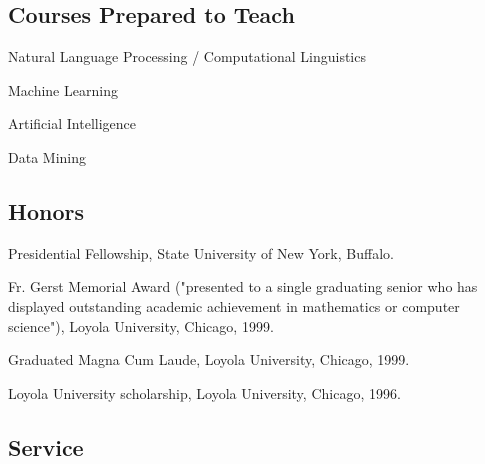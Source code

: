 \documentclass[letterpaper]{article}
\renewenvironment{itemize}{
  \begin{list}{}{
    \setlength{\leftmargin}{1.5em}
  }
}{
  \end{list}
}
\begin{document}
\subsection*{Courses Prepared to Teach}

\begin{itemize}
\item Natural Language Processing / Computational Linguistics
\item Machine Learning
\item Artificial Intelligence
\item Data Mining
\end{itemize}

\subsection*{Honors}
\begin{itemize}
\item Presidential Fellowship, State University of New York, Buffalo. 
\item Fr. Gerst Memorial Award ("presented to a single graduating senior who has displayed outstanding academic achievement in mathematics or computer science"), Loyola University, Chicago, 1999.
\item Graduated Magna Cum Laude, Loyola University, Chicago, 1999.
\item Loyola University scholarship, Loyola University, Chicago, 1996.
\end{itemize}

\subsection*{Service}
\end{document}
